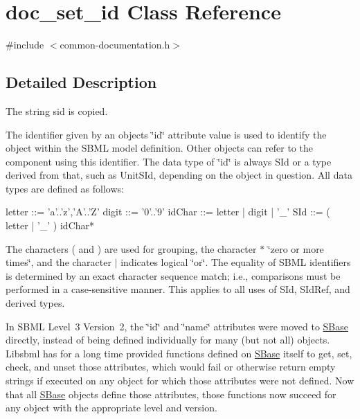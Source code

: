 \hypertarget{classdoc__set__id}{}\section{doc\+\_\+set\+\_\+id Class Reference}
\label{classdoc__set__id}


{\ttfamily \#include $<$common-\/documentation.\+h$>$}



\subsection{Detailed Description}
\begin{DoxyParagraph}{}
The string {\ttfamily sid} is copied.
\end{DoxyParagraph}
\begin{DoxyParagraph}{}
The identifier given by an object\textquotesingle{}s \char`\"{}id\char`\"{} attribute value is used to identify the object within the S\+B\+ML model definition. Other objects can refer to the component using this identifier. The data type of \char`\"{}id\char`\"{} is always {\ttfamily S\+Id} or a type derived from that, such as {\ttfamily Unit\+S\+Id}, depending on the object in question. All data types are defined as follows\+: 
\begin{DoxyPre}
     letter ::= 'a'..'z','A'..'Z'
     digit  ::= '0'..'9'
     idChar ::= letter | digit | '\_'
     SId    ::= ( letter | '\_' ) idChar*
   \end{DoxyPre}

\end{DoxyParagraph}
The characters {\ttfamily (} and {\ttfamily )} are used for grouping, the character {\ttfamily $\ast$} \char`\"{}zero or more times\char`\"{}, and the character {\ttfamily $\vert$} indicates logical \char`\"{}or\char`\"{}. The equality of S\+B\+ML identifiers is determined by an exact character sequence match; i.\+e., comparisons must be performed in a case-\/sensitive manner. This applies to all uses of {\ttfamily S\+Id}, {\ttfamily S\+Id\+Ref}, and derived types.

In S\+B\+ML Level~3 Version~2, the \char`\"{}id\char`\"{} and \char`\"{}name\char`\"{} attributes were moved to \hyperlink{class_s_base}{S\+Base} directly, instead of being defined individually for many (but not all) objects. Libsbml has for a long time provided functions defined on \hyperlink{class_s_base}{S\+Base} itself to get, set, check, and unset those attributes, which would fail or otherwise return empty strings if executed on any object for which those attributes were not defined. Now that all \hyperlink{class_s_base}{S\+Base} objects define those attributes, those functions now succeed for any object with the appropriate level and version.


